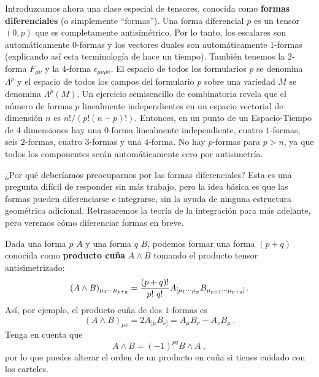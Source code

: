 \documentclass[11pt,b5paper,openany,twoside]{book}
\begin{document}
Introduzcamos ahora una clase especial de tensores, conocida como {\bf formas diferenciales} (o simplemente ``formas'').
Una forma diferencial $p$ es un tensor $(0,p)$ que es completamente antisimétrico.
Por lo tanto, los escalares son automáticamente $0$-formas y los vectores duales son automáticamente $1$-formas (explicando así esta terminología de hace un tiempo).
También tenemos la $2$-forma $F_{\mu\nu}$ y la $4$-forma $\epsilon_{\mu\nu\rho\sigma}$.
El espacio de todos los formularios $p$ se denomina $\Lambda^p$ y el espacio de todos los campos del formulario $p$ sobre una variedad $M$ se denomina $\Lambda^p(M)$.
Un ejercicio semisencillo de combinatoria revela que el número de formas $p$ linealmente independientes en un espacio vectorial de dimensión $n$ es $n!/(p!(n-p)!)$.
Entonces, en un punto de un Espacio-Tiempo de 4 dimensiones hay una $0$-forma linealmente independiente, cuatro $1$-formas, seis $2$-formas, cuatro $3$-formas y una $4$-forma.
No hay $p$-formas para $p>n$, ya que todos los componentes serán automáticamente cero por antisimetría.

¿Por qué deberíamos preocuparnos por las formas diferenciales? Esta es una pregunta difícil de responder sin más trabajo, pero la idea básica es que las formas pueden diferenciarse e integrarse, sin la ayuda de ninguna estructura geométrica adicional.
Retrasaremos la teoría de la integración para más adelante, pero veremos cómo diferenciar formas en breve.

Dada una forma $p$ $A$ y una forma $q$ $B$, podemos formar una forma $(p+q)$ conocida como {\bf producto cuña} $A\wedge B$ tomando el producto tensor antisimetrizado:
\begin{equation}
(A\wedge B)_{\mu_1 \cdots \mu_{p+q}} = {{(p+q)!}\over{p!\ q!}}
A_{[\mu_1\cdots \mu_p} B_{\mu_{p+1}\cdots\mu_{p+q}]}\,.\label{1.79}
\end{equation}
Así, por ejemplo, el producto cuña de dos $1$-formas es
\begin{equation}
(A\wedge B)_{\mu\nu} = 2A_{[\mu}B_{\nu]} = A_\mu B_\nu
- A_\nu B_\mu\,.\label{1.80}
\end{equation}
Tenga en cuenta que
\begin{equation}
A\wedge B = (-1)^{pq} B\wedge A\ ,\label{1.81}
\end{equation}
por lo que puedes alterar el orden de un producto en cuña si tienes cuidado con los carteles.
\end{document}
